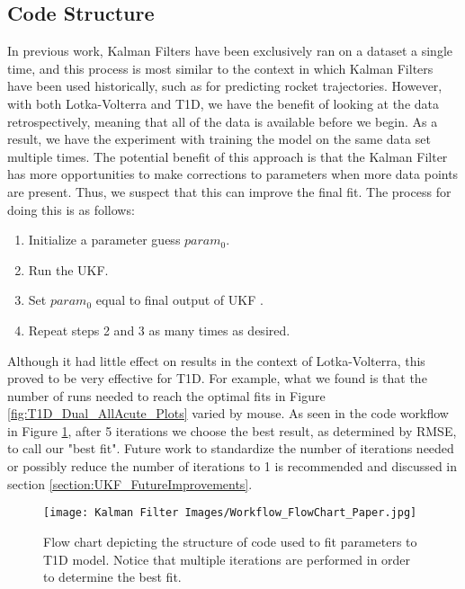 \documentclass{article}
\begin{document}
\subsection{Code Structure}
In previous work, Kalman Filters have been exclusively ran on a dataset a single time, and this process is most similar to the context in which Kalman Filters have been used historically, such as for predicting rocket trajectories. However, with both Lotka-Volterra and T1D, we have the benefit of looking at the data retrospectively, meaning that all of the data is available before we begin. As a result, we have the experiment with training the model on the same data set multiple times. The potential benefit of this approach is that the Kalman Filter has more opportunities to make corrections to parameters when more data points are present. Thus, we suspect that this can improve the final fit. The process for doing this is as follows:
\begin{enumerate}
    \item Initialize a parameter guess $param_0$.
    \item Run the UKF.
    \item Set $param_0$ equal to final output of UKF .
    \item Repeat steps 2 and 3 as many times as desired.
\end{enumerate}
Although it had little effect on results in the context of Lotka-Volterra, this proved to be very effective for T1D. For example, what we found is that the number of runs needed to reach the optimal fits in Figure \ref{fig:T1D_Dual_AllAcute_Plots} varied by mouse. As seen in the code workflow in Figure \ref{fig:T1D_CodeFlow}, after 5 iterations we choose the best result, as determined by RMSE, to call our "best fit". Future work to standardize the number of iterations needed or possibly reduce the number of iterations to 1 is recommended and discussed in section \ref{section:UKF_FutureImprovements}.
\begin{figure}[H]
    \centering
    \texttt{[image: Kalman Filter Images/Workflow\_FlowChart\_Paper.jpg]}
    \caption{Flow chart depicting the structure of code used to fit parameters to T1D model. Notice that multiple iterations are performed in order to determine the best fit.}
    \label{fig:T1D_CodeFlow}
\end{figure}
\end{document}
